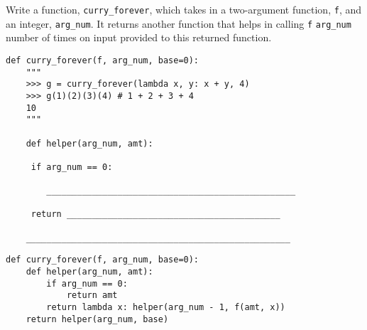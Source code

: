 \begin{blocksection}
\question Write a function, \texttt{curry\_forever}, which takes in a two-argument function, \texttt{f}, and an integer, \texttt{arg\_num}. It returns another function that helps in calling \texttt{f} \texttt{arg\_num} number of times on input provided to this returned function.

\begin{lstlisting}
def curry_forever(f, arg_num, base=0):
    """
    >>> g = curry_forever(lambda x, y: x + y, 4)
    >>> g(1)(2)(3)(4) # 1 + 2 + 3 + 4
    10 
    """

    def helper(arg_num, amt):
    
   	 if arg_num == 0:
   	 
   	    _________________________________________________
   	    
   	 return __________________________________________
   	 
    ____________________________________________________

\end{lstlisting}

\begin{solution}
\begin{lstlisting}
def curry_forever(f, arg_num, base=0):
    def helper(arg_num, amt):
   	    if arg_num == 0:
   		    return amt
   	    return lambda x: helper(arg_num - 1, f(amt, x))
    return helper(arg_num, base)

\end{lstlisting}
\end{solution}
\end{blocksection}
